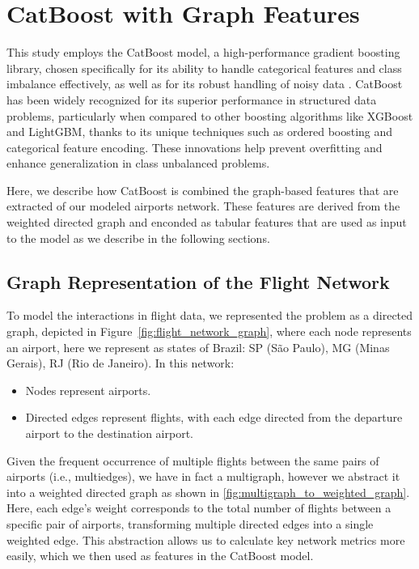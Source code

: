 \section{CatBoost with Graph Features}
\label{sec:catboost_model}

This study employs the CatBoost model, a high-performance gradient boosting library, chosen specifically for its ability to handle categorical features and class imbalance effectively, as well as for its robust handling of noisy data \cite{prokhorenkova2018catboost}. CatBoost has been widely recognized for its superior performance in structured data problems, particularly when compared to other boosting algorithms like XGBoost and LightGBM, thanks to its unique techniques such as ordered boosting and categorical feature encoding. These innovations help prevent overfitting and enhance generalization in class unbalanced problems.

Here, we describe how CatBoost is combined the graph-based features that are extracted of our modeled airports network. These features are derived from the weighted directed graph and enconded as tabular features that are used as input to the model as we describe in the following sections.


\subsection{Graph Representation of the Flight Network}



To model the interactions in flight data, we represented the problem as a directed graph, depicted in Figure~\ref{fig:flight_network_graph}, where each node represents an airport, here we represent as states of Brazil: SP (São Paulo), MG (Minas Gerais), RJ (Rio de Janeiro). In this network:
\begin{itemize}
    \item Nodes represent airports.
    \item Directed edges represent flights, with each edge directed from the departure airport to the destination airport.
\end{itemize}
Given the frequent occurrence of multiple flights between the same pairs of airports (i.e., multiedges), we have in fact a multigraph, however we abstract it into a weighted directed graph as shown in \ref{fig:multigraph_to_weighted_graph}. Here, each edge's weight corresponds to the total number of flights between a specific pair of airports, transforming multiple directed edges into a single weighted edge. This abstraction allows us to calculate key network metrics more easily, which we then used as features in the CatBoost model.

